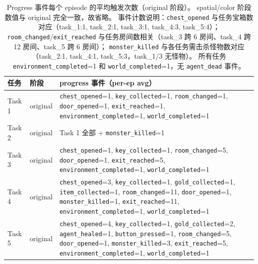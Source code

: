 \documentclass[12pt,a4paper]{ctexart}
\begin{document}
\begin{table}[H]
\centering
\begin{tabular}{p{}p{}p{}}
\toprule
任务 & 阶段 & progress 事件（per-ep avg） \\
\midrule
Task 1 & original & \texttt{chest\_opened}=1, \texttt{key\_collected}=1, \texttt{room\_changed}=1, \texttt{door\_opened}=1, \texttt{exit\_reached}=1, \texttt{environment\_completed}=1, \texttt{world\_completed}=1 \\
Task 2 & original & Task 1 全部 + \texttt{monster\_killed}=1 \\
Task 3 & original & \texttt{chest\_opened}=1, \texttt{key\_collected}=1, \texttt{room\_changed}=5, \texttt{door\_opened}=1, \texttt{exit\_reached}=5, \texttt{environment\_completed}=1, \texttt{world\_completed}=1 \\
Task 4 & original & \texttt{chest\_opened}=3, \texttt{key\_collected}=1, \texttt{gold\_collected}=1, \texttt{item\_collected}=1, \texttt{room\_changed}=11, \texttt{door\_opened}=1, \texttt{monster\_killed}=1, \texttt{exit\_reached}=11, \texttt{environment\_completed}=1, \texttt{world\_completed}=1 \\
Task 5 & original & \texttt{chest\_opened}=4, \texttt{key\_collected}=1, \texttt{gold\_collected}=2, \texttt{agent\_healed}=1, \texttt{button\_pressed}=1, \texttt{room\_changed}=5, \texttt{door\_opened}=1, \texttt{monster\_killed}=3, \texttt{exit\_reached}=5, \texttt{environment\_completed}=1, \texttt{world\_completed}=1 \\
\bottomrule
\end{tabular}
\caption{Progress 事件每个 episode 的平均触发次数（original 阶段）。
spatial/color 阶段数值与 original 完全一致，故省略。
事件计数说明：\texttt{chest\_opened} 与任务宝箱数对应（task\_1:1, task\_2:1, task\_3:1, task\_4:3, task\_5:4）；
\texttt{room\_changed}/\texttt{exit\_reached} 与任务房间数相关（task\_3 跨 6 房间、task\_4 跨 12 房间、task\_5 跨 6 房间）；
\texttt{monster\_killed} 与各任务需击杀怪物数对应（task\_2:1, task\_4:1, task\_5:3，task\_1/3 无怪物）。
所有任务 \texttt{environment\_completed}=1 和 \texttt{world\_completed}=1，无 \texttt{agent\_dead} 事件。}
\end{table}
\end{document}
